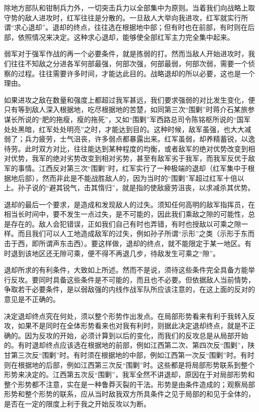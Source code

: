 除地方部队和钳制兵力外，一切突击兵力以全部集中为原则。当着我们向战略上取守势的敌人进攻时，红军往往是分散的。一旦敌人大举向我进攻，红军就实行所谓“求心退却”。退却的终点，往往选在根据地中部；但有时也在前部，有时则在后部，依照情况来决定。这种求心退却，能够使全部红军主力完全集中起来。

弱军对于强军作战的再一个必要条件，就是拣弱的打。然而当敌人开始进攻时，我们往往不知敌之分进各军何部最强，何部次强，何部最弱，何部次弱，需要一个侦察的过程。往往需要许多时间，才能达此目的。战略退却的所以必要，这也是一个理由。

如果进攻之敌在数量和强度上都超过我军甚远，我们要求强弱的对比发生变化，便只有等到敌人深入根据地，吃尽根据地的苦楚，如同第三次“围剿”时蒋介石某旅参谋长所说的“肥的拖瘦，瘦的拖死”，又如“围剿”军西路总司令陈铭枢所说的“国军处处黑暗，红军处处明亮”之时，才能达到目的。这种时候，敌军虽强，也大大减弱了；兵力疲劳，士气沮丧，许多弱点都暴露出来。红军虽弱，却养精蓄锐，以逸待劳。此时双方对比，往往能达到某种程度的均衡，或者敌军的绝对优势改变到相对优势，我军的绝对劣势改变到相对劣势，甚至有敌军劣于我军，而我军反优于敌军的事情。江西反对第三次“围剿”时，红军实行了一种极端的退却（红军集中于根据地后部），然而非此是不能战胜敌人的，因为当时的“围剿”军超过红军十倍以上。孙子说的“避其锐气，击其惰归”，就是指的使敌疲劳沮丧，以求减杀其优势。

退却的最后一个要求，是造成和发现敌人的过失。须知任何高明的敌军指挥员，在相当长时间中，要不发生一点过失，是不可能的，因此我们乘敌之隙的可能性，总是存在的。敌人会犯错误，正如我们自己有时也弄错，有时也授敌以可乘之隙一样。而且我们可以人工地造成敌军的过失，例如孙子所谓“示形”之类（示形于东而击于西，即所谓声东击西）。要这样做，退却的终点，就不能限定于某一地区。有时退到该地区还无隙可乘，便不得不再退几步，待敌发生可乘之“隙”。

退却所求的有利条件，大致如上所述。然而不是说，须待这些条件完全具备方能举行反攻。要同时具备这些条件是不可能的，而且也不必要。但依据敌人当前情势，争取若干必要条件，是以弱敌强的内线作战军队所应该注意的，在这上面的反对的意见是不正确的。

决定退却终点究在何处，须以整个形势作出发点。在局部形势看来有利于我转入反攻，如果不是同时在全体形势看来也对我有利时，则据此决定退却终点，就是不正确的。因为反攻的开始，必须计算到以后的变化，而我们的反攻总是从局部开始的。有时退却终点应该选在根据地的前部，例如江西第二次、第四次反“围剿”，陕甘第三次反“围剿”时。有时须在根据地的中部，例如江西第一次反“围剿”时。有时则在根据地的后部，例如江西第三次反“围剿”时。这些都是将局部形势联系到整个形势来决定的。江西第五次反“围剿”，我军全然不讲退却，原因在于对局部形势和整个形势都不注意，实在是一种鲁莽灭裂的干法。形势是由条件造成的；观察局部形势和整个形势的联系，应从当时敌我双方所具条件之见于局部的和见于全体的，是否在一定的限度上利于我之开始反攻以为断。

